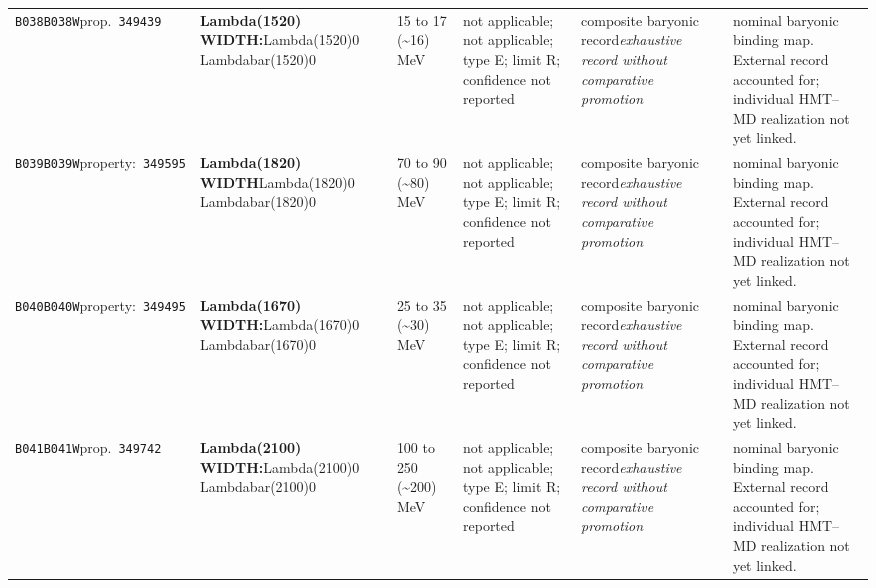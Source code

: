 \begin{landscape}
\begin{longtable}{L{1.85cm}L{4.45cm}L{2.35cm}L{4.05cm}L{3.35cm}L{7.15cm}}
\texttt{B038}\newline \texttt{B038W}\newline prop.\ \texttt{349439} & \textbf{Lambda(1520) WIDTH:}\newline Lambda(1520)0 \textbar{}\allowbreak{} Lambdabar(1520)0 & 15 to 17 (\textasciitilde{}16)\,MeV & not applicable; not applicable; type E; limit R; confidence not reported & composite baryonic record\newline \emph{exhaustive record without comparative promotion} & nominal baryonic binding map. External record accounted for; individual HMT--MD realization not yet linked. \\
\texttt{B039}\newline \texttt{B039W}\newline property:\ \texttt{349595} & \textbf{Lambda(1820) WIDTH}\newline Lambda(1820)0 \textbar{}\allowbreak{} Lambdabar(1820)0 & 70 to 90 (\textasciitilde{}80)\,MeV & not applicable; not applicable; type E; limit R; confidence not reported & composite baryonic record\newline \emph{exhaustive record without comparative promotion} & nominal baryonic binding map. External record accounted for; individual HMT--MD realization not yet linked. \\
\texttt{B040}\newline \texttt{B040W}\newline property:\ \texttt{349495} & \textbf{Lambda(1670) WIDTH:}\newline Lambda(1670)0 \textbar{}\allowbreak{} Lambdabar(1670)0 & 25 to 35 (\textasciitilde{}30)\,MeV & not applicable; not applicable; type E; limit R; confidence not reported & composite baryonic record\newline \emph{exhaustive record without comparative promotion} & nominal baryonic binding map. External record accounted for; individual HMT--MD realization not yet linked. \\
\texttt{B041}\newline \texttt{B041W}\newline prop.\ \texttt{349742} & \textbf{Lambda(2100) WIDTH:}\newline Lambda(2100)0 \textbar{}\allowbreak{} Lambdabar(2100)0 & 100 to 250 (\textasciitilde{}200)\,MeV & not applicable; not applicable; type E; limit R; confidence not reported & composite baryonic record\newline \emph{exhaustive record without comparative promotion} & nominal baryonic binding map. External record accounted for; individual HMT--MD realization not yet linked. \\

\end{longtable}
\end{landscape}
